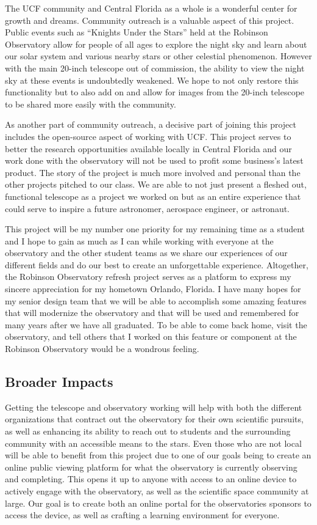\documentclass[12pt]{report}
\begin{document}
The UCF community and Central Florida as a whole is a wonderful center for growth and dreams.  Community outreach is a valuable aspect of this project.  Public events such as “Knights Under the Stars” held at the Robinson Observatory allow for people of all ages to explore the night sky and learn about our solar system and various nearby stars or other celestial phenomenon.  However with the main 20-inch telescope out of commission, the ability to view the night sky at these events is undoubtedly weakened.  We hope to not only restore this functionality but to also add on and allow for images from the 20-inch telescope to be shared more easily with the community.

As another part of community outreach, a decisive part of joining this project includes the open-source aspect of working with UCF.  This project serves to better the research opportunities available locally in Central Florida and our work done with the observatory will not be used to profit some business’s latest product.  The story of the project is much more involved and personal than the other projects pitched to our class.  We are able to not just present a fleshed out, functional telescope as a project we worked on but as an entire experience that could serve to inspire a future astronomer, aerospace engineer, or astronaut.

This project will be my number one priority for my remaining time as a student and I hope to gain as much as I can while working with everyone at the observatory and the other student teams as we share our experiences of our different fields and do our best to create an unforgettable experience.  Altogether, the Robinson Observatory refresh project serves as a platform to express my sincere appreciation for my hometown Orlando, Florida. I have many hopes for my senior design team that we will be able to accomplish some amazing features that will modernize the observatory and that will be used and remembered for many years after we have all graduated.  To be able to come back home, visit the observatory, and tell others that I worked on this feature or component at the Robinson Observatory would be a wondrous feeling.

\subsection*{Broader Impacts}

Getting the telescope and observatory working will help with both the different organizations that contract out the observatory for their own scientific pursuits, as well as enhancing its ability to reach out to students and the surrounding community with an accessible means to the stars. Even those who are not local will be able to benefit from this project due to one of our goals being to create an online public viewing platform for what the observatory is currently observing and completing. This opens it up to anyone with access to an online device to actively engage with the observatory, as well as the scientific space community at large. Our goal is to create both an online portal for the observatories sponsors to access the device, as well as crafting a learning environment for everyone.
\end{document}
